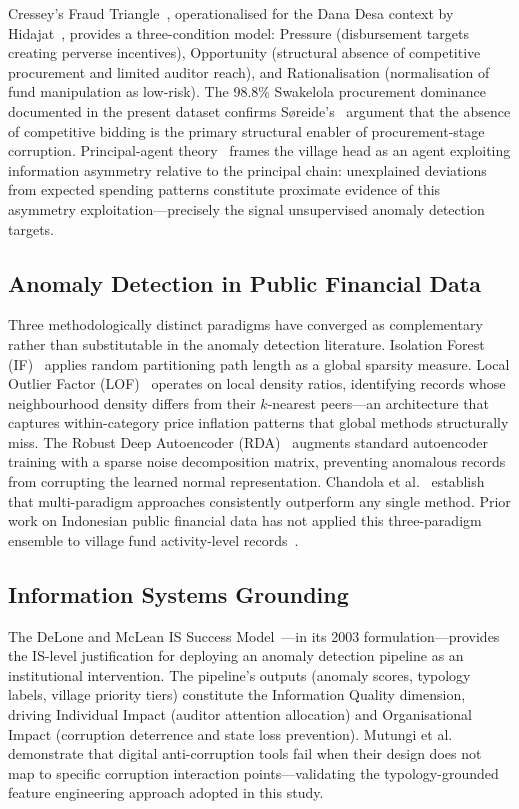 \documentclass[3p,times,procedia]{elsarticle}
\begin{document}
Cressey's Fraud Triangle~\cite{ref21}, operationalised for the Dana Desa context by Hidajat~\cite{ref12}, provides a three-condition model: Pressure (disbursement targets creating perverse incentives), Opportunity (structural absence of competitive procurement and limited auditor reach), and Rationalisation (normalisation of fund manipulation as low-risk). The 98.8\% Swakelola procurement dominance documented in the present dataset confirms S{\o}reide's~\cite{ref22} argument that the absence of competitive bidding is the primary structural enabler of procurement-stage corruption. Principal-agent theory~\cite{ref23} frames the village head as an agent exploiting information asymmetry relative to the principal chain: unexplained deviations from expected spending patterns constitute proximate evidence of this asymmetry exploitation---precisely the signal unsupervised anomaly detection targets.

\subsection{Anomaly Detection in Public Financial Data}

Three methodologically distinct paradigms have converged as complementary rather than substitutable in the anomaly detection literature. Isolation Forest (IF)~\cite{ref24,ref25} applies random partitioning path length as a global sparsity measure. Local Outlier Factor (LOF)~\cite{ref26} operates on local density ratios, identifying records whose neighbourhood density differs from their $k$-nearest peers---an architecture that captures within-category price inflation patterns that global methods structurally miss. The Robust Deep Autoencoder (RDA)~\cite{ref27} augments standard autoencoder training with a sparse noise decomposition matrix, preventing anomalous records from corrupting the learned normal representation. Chandola et al.~\cite{ref28} establish that multi-paradigm approaches consistently outperform any single method. Prior work on Indonesian public financial data has not applied this three-paradigm ensemble to village fund activity-level records~\cite{ref29,ref30}.

\subsection{Information Systems Grounding}

The DeLone and McLean IS Success Model~\cite{ref31}---in its 2003 formulation---provides the IS-level justification for deploying an anomaly detection pipeline as an institutional intervention. The pipeline's outputs (anomaly scores, typology labels, village priority tiers) constitute the Information Quality dimension, driving Individual Impact (auditor attention allocation) and Organisational Impact (corruption deterrence and state loss prevention). Mutungi et al.~\cite{ref11} demonstrate that digital anti-corruption tools fail when their design does not map to specific corruption interaction points---validating the typology-grounded feature engineering approach adopted in this study.
\end{document}
